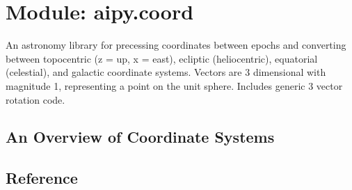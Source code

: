 \section{Module: aipy.coord}

An astronomy library for precessing coordinates between epochs and converting 
between topocentric (z = up, x = east), ecliptic (heliocentric), equatorial
(celestial), and galactic coordinate systems.  Vectors are 3 dimensional 
with magnitude 1, representing a point on the unit sphere.  Includes generic 
3 vector rotation code.

\subsection{An Overview of Coordinate Systems}

\subsection{Reference}

